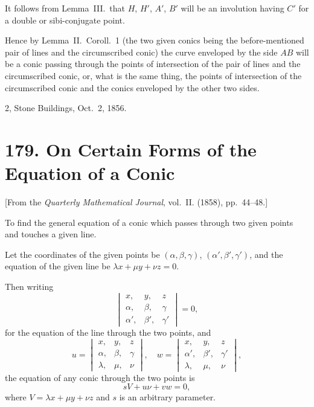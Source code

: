 \documentclass[12pt,a4paper]{article}
\theoremstyle{plain}
\theoremstyle{definition}
\begin{document}
It follows from Lemma~III.\ that $H$, $H'$, $A'$, $B'$ will be an involution having $C'$ for a double or sibi-conjugate point.

Hence by Lemma~II.\ Coroll.~1 (the two given conics being the before-mentioned pair of lines and the circumscribed conic) the curve enveloped by the side $AB$ will be a conic passing through the points of intersection of the pair of lines and the circumscribed conic, or, what is the same thing, the points of intersection of the circumscribed conic and the conics enveloped by the other two sides.

\begin{flushright}
2, Stone Buildings, Oct.~2, 1856.
\end{flushright}


\newpage
\section*{179. On Certain Forms of the Equation of a Conic}

[From the \textit{Quarterly Mathematical Journal}, vol.~II. (1858), pp.~44--48.]

To find the general equation of a conic which passes through two given points and touches a given line.

Let the coordinates of the given points be $(\alpha, \beta, \gamma)$, $(\alpha', \beta', \gamma')$, and the equation of the given line be $\lambda x + \mu y + \nu z = 0$.

Then writing
\[
\begin{vmatrix}
x, & y, & z \\
\alpha, & \beta, & \gamma \\
\alpha', & \beta', & \gamma'
\end{vmatrix} = 0,
\]
for the equation of the line through the two points, and
\[
u = \begin{vmatrix} x, & y, & z \\ \alpha, & \beta, & \gamma \\ \lambda, & \mu, & \nu \end{vmatrix}, \quad
w = \begin{vmatrix} x, & y, & z \\ \alpha', & \beta', & \gamma' \\ \lambda, & \mu, & \nu \end{vmatrix},
\]
the equation of any conic through the two points is
\[
sV + u\nu + vw = 0,
\]
where $V = \lambda x + \mu y + \nu z$ and $s$ is an arbitrary parameter.
\end{document}
